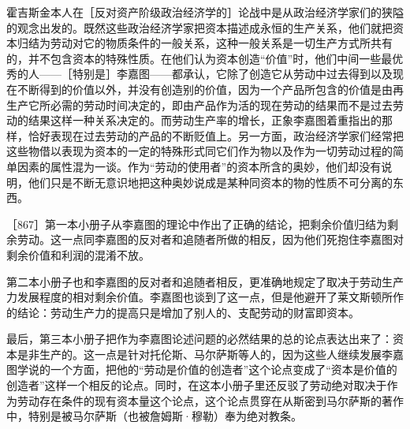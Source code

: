 霍吉斯金本人在［反对资产阶级政治经济学的］论战中是从政治经济学家们的狭隘的观念出发的。既然这些政治经济学家把资本描述成永恒的生产关系，他们就把资本归结为劳动对它的物质条件的一般关系，这种一般关系是一切生产方式所共有的，并不包含资本的特殊性质。在他们认为资本创造“价值”时，他们中间一些最优秀的人——［特别是］李嘉图——都承认，它除了创造它从劳动中过去得到以及现在不断得到的价值以外，并没有创造别的价值，因为一个产品所包含的价值是由再生产它所必需的劳动时间决定的，即由产品作为活的现在劳动的结果而不是过去劳动的结果这样一种关系决定的。而劳动生产率的增长，正象李嘉图着重指出的那样，恰好表现在过去劳动的产品的不断贬值上。另一方面，政治经济学家们经常把这些物借以表现为资本的一定的特殊形式同它们作为物以及作为一切劳动过程的简单因素的属性混为一谈。作为“劳动的使用者”的资本所含的奥妙，他们却没有说明，他们只是不断无意识地把这种奥妙说成是某种同资本的物的性质不可分离的东西。

［867］第一本小册子从李嘉图的理论中作出了正确的结论，把剩余价值归结为剩余劳动。这一点同李嘉图的反对者和追随者所做的相反，因为他们死抱住李嘉图对剩余价值和利润的混淆不放。

第二本小册子也和李嘉图的反对者和追随者相反，更准确地规定了取决于劳动生产力发展程度的相对剩余价值。李嘉图也谈到了这一点，但是他避开了莱文斯顿所作的结论：劳动生产力的提高只是增加了别人的、支配劳动的财富即资本。

最后，第三本小册子把作为李嘉图论述问题的必然结果的总的论点表达出来了：资本是非生产的。这一点是针对托伦斯、马尔萨斯等人的，因为这些人继续发展李嘉图学说的一个方面，把他的“劳动是价值的创造者”这个论点变成了“资本是价值的创造者”这样一个相反的论点。同时，在这本小册子里还反驳了劳动绝对取决于作为劳动存在条件的现有资本量这个论点，这个论点贯穿在从斯密到马尔萨斯的著作中，特别是被马尔萨斯（也被詹姆斯·穆勒）奉为绝对教条。

